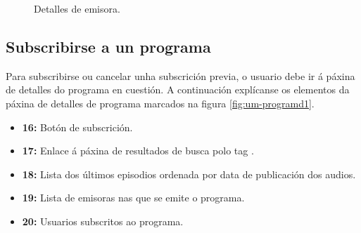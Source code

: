 \begin{figure}[h]
	\centering
	\caption{Detalles de emisora.}
	\label{fig:um-stationd1}
\end{figure}

\subsection{Subscribirse a un programa}

Para subscribirse ou cancelar unha subscrición previa, o usuario debe ir á páxina de detalles do programa en cuestión. A continuación explícanse os elementos da páxina de detalles de programa marcados na figura \ref{fig:um-programd1}.

\begin{itemize}
	\item \textbf{16:} Botón de subscrición.
	\item \textbf{17:} Enlace á páxina de resultados de busca polo tag .
	\item \textbf{18:} Lista dos últimos episodios ordenada por data de publicación dos audios.
	\item \textbf{19:} Lista de emisoras nas que se emite o programa.
	\item \textbf{20:} Usuarios subscritos ao programa.
\end{itemize}

